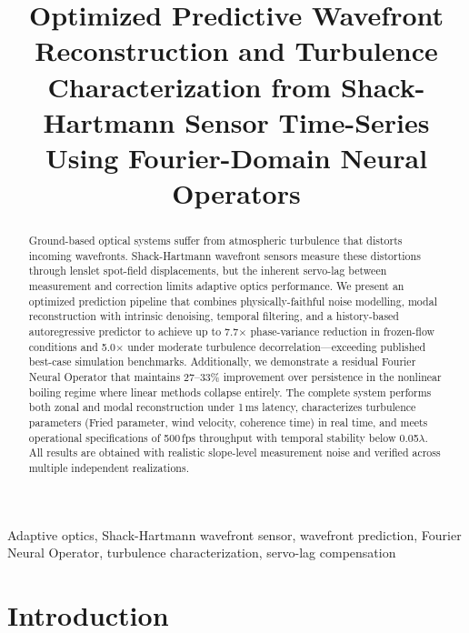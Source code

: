 \documentclass[conference]{IEEEtran}
\begin{document}
\title{Optimized Predictive Wavefront Reconstruction and Turbulence Characterization from Shack-Hartmann Sensor Time-Series Using Fourier-Domain Neural Operators}

\author{
}

\maketitle

\begin{abstract}
Ground-based optical systems suffer from atmospheric turbulence that distorts incoming wavefronts. Shack-Hartmann wavefront sensors measure these distortions through lenslet spot-field displacements, but the inherent servo-lag between measurement and correction limits adaptive optics performance. We present an optimized prediction pipeline that combines physically-faithful noise modelling, modal reconstruction with intrinsic denoising, temporal filtering, and a history-based autoregressive predictor to achieve up to 7.7$\times$ phase-variance reduction in frozen-flow conditions and 5.0$\times$ under moderate turbulence decorrelation---exceeding published best-case simulation benchmarks. Additionally, we demonstrate a residual Fourier Neural Operator that maintains 27--33\% improvement over persistence in the nonlinear boiling regime where linear methods collapse entirely. The complete system performs both zonal and modal reconstruction under 1\,ms latency, characterizes turbulence parameters (Fried parameter, wind velocity, coherence time) in real time, and meets operational specifications of 500\,fps throughput with temporal stability below 0.05$\lambda$. All results are obtained with realistic slope-level measurement noise and verified across multiple independent realizations.
\end{abstract}

\begin{IEEEkeywords}
Adaptive optics, Shack-Hartmann wavefront sensor, wavefront prediction, Fourier Neural Operator, turbulence characterization, servo-lag compensation
\end{IEEEkeywords}

\section{Introduction}
\end{document}
